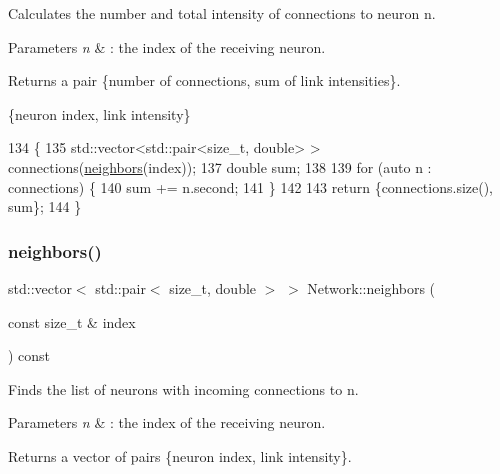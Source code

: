 Calculates the number and total intensity of connections to neuron {\ttfamily n}. 
\begin{DoxyParams}{Parameters}
{\em n} & \+: the index of the receiving neuron. \\
\hline
\end{DoxyParams}
\begin{DoxyReturn}{Returns}
a pair \{number of connections, sum of link intensities\}. 
\end{DoxyReturn}
\{neuron index, link intensity\} 
\begin{DoxyCode}
134 \{
135     std::vector<std::pair<size\_t, double> > connections(\hyperlink{classNetwork_abf7324fe99e691cb9b06247e5e5013fd}{neighbors}(index));
137     \textcolor{keywordtype}{double} sum;
138 
139     \textcolor{keywordflow}{for} (\textcolor{keyword}{auto} n : connections) \{
140         sum += n.second;
141     \}
142     
143     \textcolor{keywordflow}{return} \{connections.size(), sum\};
144 \}
\end{DoxyCode}
\mbox{\label{classNetwork_abf7324fe99e691cb9b06247e5e5013fd}} 
\subsubsection{\texorpdfstring{neighbors()}{neighbors()}}
{\footnotesize\ttfamily std\+::vector$<$ std\+::pair$<$ size\+\_\+t, double $>$ $>$ Network\+::neighbors (\begin{DoxyParamCaption}\item[{const size\+\_\+t \&}]{index }\end{DoxyParamCaption}) const}

Finds the list of neurons with incoming connections to {\ttfamily n}. 
\begin{DoxyParams}{Parameters}
{\em n} & \+: the index of the receiving neuron. \\
\hline
\end{DoxyParams}
\begin{DoxyReturn}{Returns}
a vector of pairs \{neuron index, link intensity\}. 
\end{DoxyReturn}

